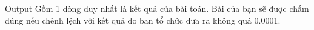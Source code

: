 Output  
Gồm 1 dòng duy nhất là kết quả của bài toán. Bài của bạn sẽ được chấm đúng nếu chênh lệch với kết quả do ban tổ chức đưa ra không quá 0.0001.